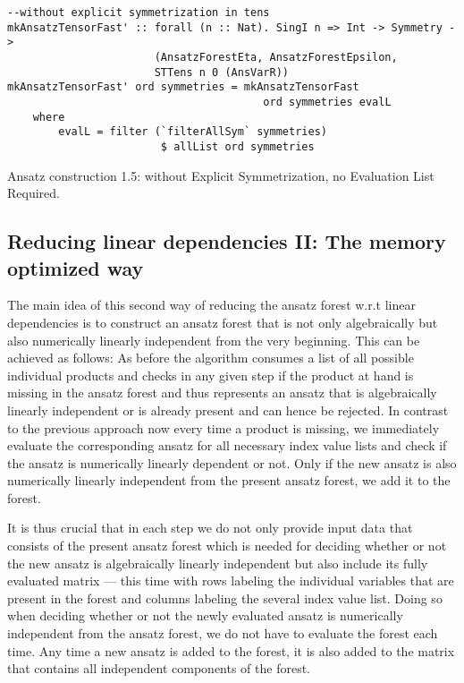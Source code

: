 \begin{listing}[hbt!]
\begin{verbatim}
--without explicit symmetrization in tens
mkAnsatzTensorFast' :: forall (n :: Nat). SingI n => Int -> Symmetry ->
                       (AnsatzForestEta, AnsatzForestEpsilon,
                       STTens n 0 (AnsVarR))
mkAnsatzTensorFast' ord symmetries = mkAnsatzTensorFast
                                        ord symmetries evalL
    where
        evalL = filter (`filterAllSym` symmetries) 
                        $ allList ord symmetries
\end{verbatim} 
\caption{Ansatz construction 1.5: without Explicit Symmetrization,  no Evaluation List Required.}\label{mkAnsatzFast'2}
\end{listing}

\subsection*{Reducing linear dependencies II:  The memory optimized way}

The main idea of this second way of reducing the ansatz forest w.r.t linear dependencies is to construct an ansatz forest that is not only algebraically but also numerically linearly independent from the very beginning. This can be achieved as follows: As before the algorithm consumes a list of all possible individual products and checks in any given step if the product at hand is missing in the ansatz forest and thus represents an ansatz that is algebraically linearly independent or is already present and can hence be rejected. In contrast to the previous approach now every time a product is missing, we immediately evaluate the corresponding ansatz for all necessary index value lists and check if the ansatz is numerically linearly dependent or not. Only if the new ansatz is also numerically linearly  independent from the present ansatz forest, we add it to the forest.

It is thus crucial that in each step we do not only provide input data that consists of the present ansatz forest which is needed for deciding whether or not the new ansatz is algebraically linearly independent but also include its fully evaluated matrix --- this time with rows labeling the individual variables that are present in the forest and columns labeling the several index value list.
Doing so when deciding whether or not the newly evaluated ansatz is numerically  independent from the ansatz forest, we do not have to evaluate the forest each time. Any time a  new ansatz is added to the forest, it is also added to the matrix that contains all independent components of the forest.

